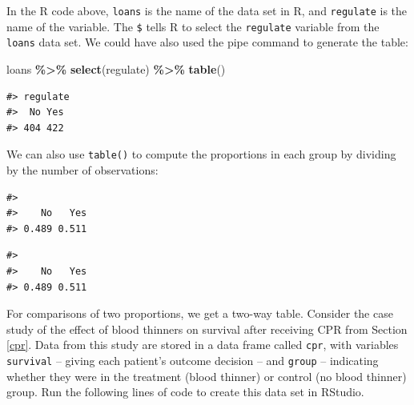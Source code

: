 \documentclass[
  10pt,
  openany]{book}
\newenvironment{Shaded}{\begin{snugshade}}{\end{snugshade}}
\newcommand{\CommentTok}[1]{\textcolor[rgb]{0.56,0.35,0.01}{\textit{#1}}}
\newcommand{\DecValTok}[1]{\textcolor[rgb]{0.00,0.00,0.81}{#1}}
\newcommand{\FunctionTok}[1]{\textcolor[rgb]{0.13,0.29,0.53}{\textbf{#1}}}
\newcommand{\NormalTok}[1]{#1}
\newcommand{\SpecialCharTok}[1]{\textcolor[rgb]{0.81,0.36,0.00}{\textbf{#1}}}
\theoremstyle{definition}
\theoremstyle{definition}
\theoremstyle{definition}
\theoremstyle{definition}
\theoremstyle{remark}
\begin{document}
In the R code above, \texttt{loans} is the name of the data set in R, and \texttt{regulate} is the name of the variable. The \texttt{\$} tells R to select the \texttt{regulate} variable from the \texttt{loans} data set. We could have also used the pipe command to generate the table:

\begin{Shaded}
\begin{Highlighting}[]
\NormalTok{loans }\SpecialCharTok{\%\textgreater{}\%} \FunctionTok{select}\NormalTok{(regulate) }\SpecialCharTok{\%\textgreater{}\%} \FunctionTok{table}\NormalTok{()}
\end{Highlighting}
\end{Shaded}

\begin{verbatim}
#> regulate
#>  No Yes 
#> 404 422
\end{verbatim}

We can also use \texttt{table()} to compute the proportions in each group by dividing by the number of observations:

\begin{Shaded}
\end{Shaded}

\begin{verbatim}
#> 
#>    No   Yes 
#> 0.489 0.511
\end{verbatim}

\begin{Shaded}
\end{Shaded}

\begin{verbatim}
#> 
#>    No   Yes 
#> 0.489 0.511
\end{verbatim}

For comparisons of two proportions, we get a two-way table. Consider the case study of the effect of blood thinners on survival after receiving CPR from Section \ref{cpr}. Data from this study are stored in a data frame called \texttt{cpr}, with variables \texttt{survival} -- giving each patient's outcome decision -- and \texttt{group} -- indicating whether they were in the treatment (blood thinner) or control (no blood thinner) group. Run the following lines of code to create this data set in RStudio.
\end{document}
